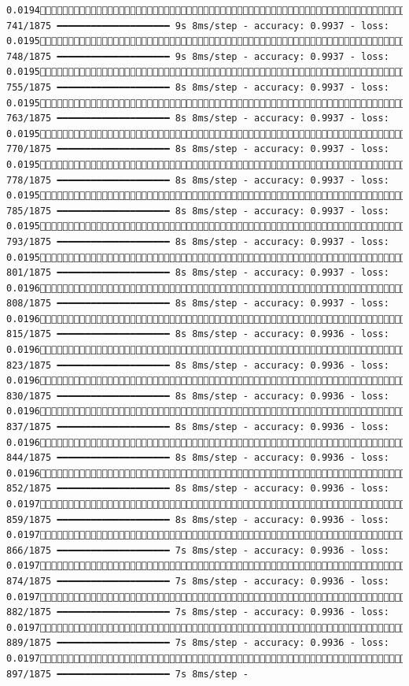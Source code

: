 \documentclass[
  letterpaper,
  DIV=11,
  numbers=noendperiod]{scrreprt}
\begin{document}
\begin{verbatim}
0.0194 741/1875 ━━━━━━━━━━━━━━━━━━━━ 9s 8ms/step - accuracy: 0.9937 - loss: 0.0195 748/1875 ━━━━━━━━━━━━━━━━━━━━ 9s 8ms/step - accuracy: 0.9937 - loss: 0.0195 755/1875 ━━━━━━━━━━━━━━━━━━━━ 8s 8ms/step - accuracy: 0.9937 - loss: 0.0195 763/1875 ━━━━━━━━━━━━━━━━━━━━ 8s 8ms/step - accuracy: 0.9937 - loss: 0.0195 770/1875 ━━━━━━━━━━━━━━━━━━━━ 8s 8ms/step - accuracy: 0.9937 - loss: 0.0195 778/1875 ━━━━━━━━━━━━━━━━━━━━ 8s 8ms/step - accuracy: 0.9937 - loss: 0.0195 785/1875 ━━━━━━━━━━━━━━━━━━━━ 8s 8ms/step - accuracy: 0.9937 - loss: 0.0195 793/1875 ━━━━━━━━━━━━━━━━━━━━ 8s 8ms/step - accuracy: 0.9937 - loss: 0.0195 801/1875 ━━━━━━━━━━━━━━━━━━━━ 8s 8ms/step - accuracy: 0.9937 - loss: 0.0196 808/1875 ━━━━━━━━━━━━━━━━━━━━ 8s 8ms/step - accuracy: 0.9937 - loss: 0.0196 815/1875 ━━━━━━━━━━━━━━━━━━━━ 8s 8ms/step - accuracy: 0.9936 - loss: 0.0196 823/1875 ━━━━━━━━━━━━━━━━━━━━ 8s 8ms/step - accuracy: 0.9936 - loss: 0.0196 830/1875 ━━━━━━━━━━━━━━━━━━━━ 8s 8ms/step - accuracy: 0.9936 - loss: 0.0196 837/1875 ━━━━━━━━━━━━━━━━━━━━ 8s 8ms/step - accuracy: 0.9936 - loss: 0.0196 844/1875 ━━━━━━━━━━━━━━━━━━━━ 8s 8ms/step - accuracy: 0.9936 - loss: 0.0196 852/1875 ━━━━━━━━━━━━━━━━━━━━ 8s 8ms/step - accuracy: 0.9936 - loss: 0.0197 859/1875 ━━━━━━━━━━━━━━━━━━━━ 8s 8ms/step - accuracy: 0.9936 - loss: 0.0197 866/1875 ━━━━━━━━━━━━━━━━━━━━ 7s 8ms/step - accuracy: 0.9936 - loss: 0.0197 874/1875 ━━━━━━━━━━━━━━━━━━━━ 7s 8ms/step - accuracy: 0.9936 - loss: 0.0197 882/1875 ━━━━━━━━━━━━━━━━━━━━ 7s 8ms/step - accuracy: 0.9936 - loss: 0.0197 889/1875 ━━━━━━━━━━━━━━━━━━━━ 7s 8ms/step - accuracy: 0.9936 - loss: 0.0197 897/1875 ━━━━━━━━━━━━━━━━━━━━ 7s 8ms/step - 
\end{verbatim}
\end{document}
